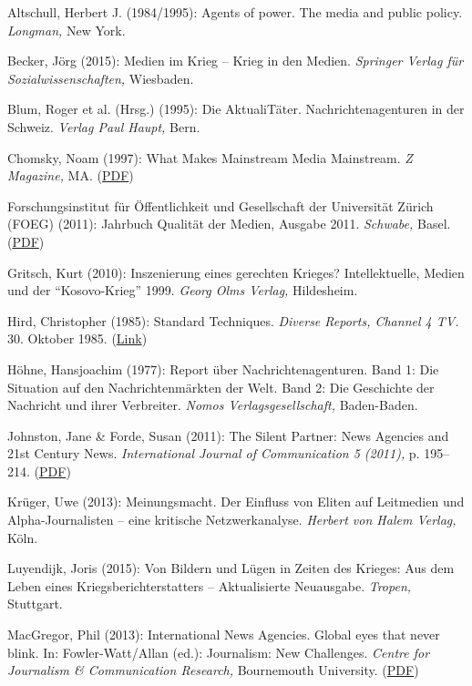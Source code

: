 Altschull, Herbert J. (1984/1995): Agents of power. The media and public
policy. \emph{Longman,} New York.

Becker, Jörg (2015): Medien im Krieg -- Krieg in den Medien.
\emph{Springer Verlag für Sozialwissenschaften,} Wiesbaden.

Blum, Roger et al. (Hrsg.) (1995): Die AktualiTäter.
Nachrichtenagenturen in der Schweiz. \emph{Verlag Paul Haupt,} Bern.

Chomsky, Noam (1997): What Makes Mainstream Media Mainstream. \emph{Z
Magazine,} MA. (\href{https://chomsky.info/199710__/}{PDF})

Forschungsinstitut für Öffentlichkeit und Gesellschaft der Universität
Zürich (FOEG) (2011): Jahrbuch Qualität der Medien, Ausgabe 2011.
\emph{Schwabe,} Basel.
(\href{http://www.foeg.uzh.ch/de/jahrbuch.html}{PDF})

Gritsch, Kurt (2010): Inszenierung eines gerechten Krieges?
Intellektuelle, Medien und der ``Kosovo-Krieg'' 1999. \emph{Georg Olms
Verlag,} Hildesheim.

Hird, Christopher (1985): Standard Techniques. \emph{Diverse Reports,
Channel 4 TV.} 30. Oktober 1985.
(\href{https://swprs.org/video-the-cia-and-the-media/}{Link})

Höhne, Hansjoachim (1977): Report über Nachrichtenagenturen. Band 1: Die
Situation auf den Nachrichtenmärkten der Welt. Band 2: Die Geschichte
der Nachricht und ihrer Verbreiter. \emph{Nomos Verlagsgesellschaft,}
Baden-Baden.

Johnston, Jane \& Forde, Susan (2011): The Silent Partner: News Agencies
and 21st Century News. \emph{International Journal of Communication 5
(2011),} p. 195--214.
(\href{https://ijoc.org/index.php/ijoc/article/view/928}{PDF})

Krüger, Uwe (2013): Meinungsmacht. Der Einfluss von Eliten auf
Leitmedien und Alpha-Journalisten -- eine kritische Netzwerkanalyse.
\emph{Herbert von Halem Verlag,} Köln.

Luyendijk, Joris (2015): Von Bildern und Lügen in Zeiten des Krieges:
Aus dem Leben eines Kriegsberichterstatters -- Aktualisierte Neuausgabe.
\emph{Tropen,} Stuttgart.

MacGregor, Phil (2013): International News Agencies. Global eyes that
never blink. In: Fowler-Watt/Allan (ed.): Journalism: New Challenges.
\emph{Centre for Journalism \& Communication Research,} Bournemouth
University.
(\href{https://microsites.bournemouth.ac.uk/cjcr/files/2013/10/JNC-2013-Chapter-3-MacGregor.pdf}{PDF})

